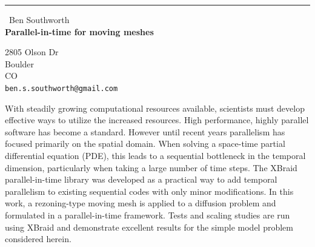\documentclass{report}
\begin{document}
\begin{center}
\rule{6in}{1pt} \
{\large Ben Southworth \\
{\bf Parallel-in-time for moving meshes}}

2805 Olson Dr \\ Boulder \\ CO
\\
{\tt ben.s.southworth@gmail.com}\end{center}

With steadily growing computational resources available, scientists must
develop effective ways to utilize the increased resources. High
performance, highly parallel software has become a standard. However
until recent years parallelism has focused primarily on the spatial
domain. When solving a space-time partial differential equation (PDE),
this leads to a sequential bottleneck in the temporal dimension,
particularly when taking a large number of time steps. The XBraid
parallel-in-time library was developed as a practical way to add temporal
parallelism to existing sequential codes with only minor modifications.
In this work, a rezoning-type moving mesh is applied to a diffusion
problem and formulated in a parallel-in-time framework. Tests and scaling
studies are run using XBraid and demonstrate excellent results for the
simple model problem considered herein.
\end{document}
